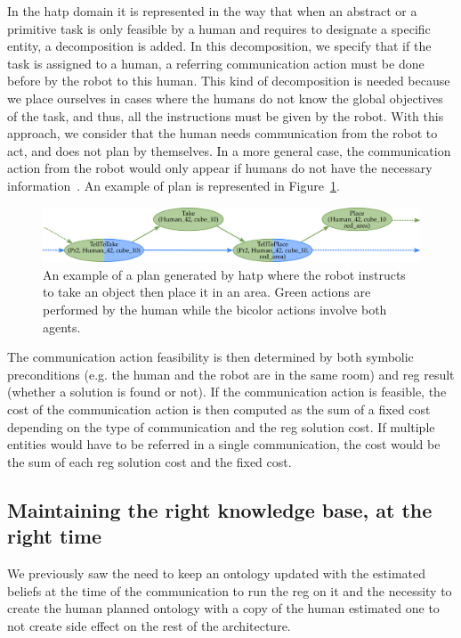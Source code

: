 In the \acrshort{hatp} domain it is represented in the way that when an abstract or a primitive task is only feasible by a human and requires to designate a specific entity, a decomposition is added. In this decomposition, we specify that if the task is assigned to a human, a referring communication action must be done before by the robot to this human. This kind of decomposition is needed because we place ourselves in cases where the humans do not know the global objectives of the task, and thus, all the instructions must be given by the robot. With this approach, we consider that the human needs communication from the robot to act, and does not plan by themselves. In a more general case, the communication action from the robot would only appear if humans do not have the necessary information~\cite{devin_2016_implemented}. An example of plan is represented in Figure~\ref{fig:chap5_plan}.

\begin{figure}[!ht]
\centering
\includegraphics[width=\textwidth]{figures/chapter5/plan.png}
\caption{\label{fig:chap5_plan} An example of a plan generated by \acrshort{hatp} where the robot instructs to take an object then place it in an area. Green actions are performed by the human while the bicolor actions involve both agents. }
\end{figure}

The communication action feasibility is then determined by both symbolic preconditions (e.g. the human and the robot are in the same room) and \acrshort{reg} result (whether a solution is found or not). If the communication action is feasible, the cost of the communication action is then computed as the sum of a fixed cost depending on the type of communication and the \acrshort{reg} solution cost. If multiple entities would have to be referred in a single communication, the cost would be the sum of each \acrshort{reg} solution cost and the fixed cost.

\subsection{Maintaining the right knowledge base, at the right time}

We previously saw the need to keep an ontology updated with the estimated beliefs at the time of the communication to run the \acrshort{reg} on it and the necessity to create the human planned ontology with a copy of the human estimated one to not create side effect on the rest of the architecture.

